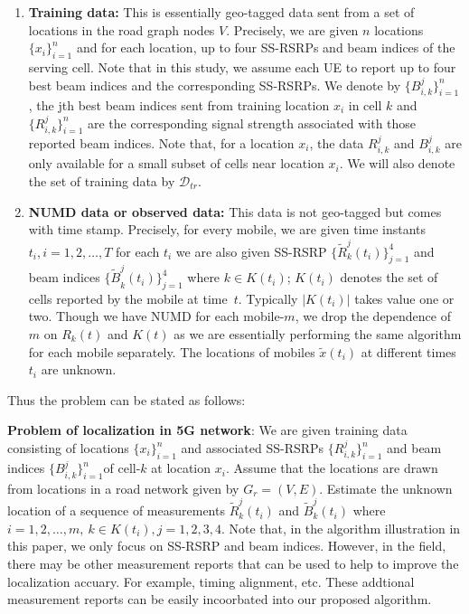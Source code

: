 \documentclass[conference, 10pt]{IEEEtran}
\newcommand{\abs}[1]{\lvert #1 \rvert}
\newcommand{\card}[1]{\abs{#1}}
\begin{document}
\begin{enumerate}

\item \textbf{Training data:} This is essentially geo-tagged data sent from
a set of locations in the road graph nodes $V$. Precisely, we are given $n$ locations
$\{x_i\}_{i=1}^n$ and for each location, up to four SS-RSRPs and beam indices of
the serving cell. Note that in this study, we assume each UE to report up to four best beam indices and the corresponding SS-RSRPs.
We denote by $\{B^{j}_{i,k}\}_{i=1}^n$, the jth best beam indices sent from training location $x_i$ in cell $k$ and $\{R^j_{i,k}\}_{i=1}^n$ are the corresponding signal strength 
associated with those reported beam indices. Note
that, for a location $x_i$, the data $R^j_{i,k}$  and $B^j_{i,k}$ are only available
for a small subset of cells near location $x_i$. We will also denote the set of
training data by $\mathcal{D}_{tr}$.

\item \textbf{NUMD data or observed data:} This data is not geo-tagged but comes
with time stamp. Precisely, for every mobile, we are given time instants
$t_i, i=1,2,\hdots,T$ for each $t_i$ we are also given SS-RSRP
$\{{\tilde{R}}^j_k(t_i)\}_{j=1}^4$ and beam indices ${\{\tilde{B}}^j_k(t_i)\}_{j=1}^4$ where $k\in K(t_i)$; $K(t_i)$ denotes the set of cells reported by
the mobile at time~$t$. Typically $\card{K(t_i)}$ takes value one or two.
Though we have NUMD for each mobile-$m$, we drop the dependence of $m$
on $R_k(t)$ and $K(t)$ as we are essentially performing the same algorithm
for each mobile separately. The locations of mobiles $\tilde{x}(t_i)$ at different
times $t_i$ are unknown.
	
\end{enumerate} 

Thus the problem can be stated as follows:

 {\bf Problem of localization in 5G network}: We are given training data consisting
of locations $\{x_i\}_{i=1}^n$ and associated SS-RSRPs  $\{R^j_{i,k}\}_{i=1}^n$ and beam indices $\{B^j_{i,k}\}_{i=1}^n$of
cell-$k$ at location $x_i$. Assume that the locations
are drawn from locations in a road network given by $G_r=(V,E)$. Estimate the unknown location of a sequence of measurements
${\tilde{R}}^j_k(t_i)$ and ${\tilde{B}}^j_k(t_i)$ where $i=1,2,\hdots,m,\ k\in K(t_i), j=1, 2, 3, 4$. 
Note that, in the algorithm illustration in this paper, we only focus on SS-RSRP and beam indices. However, in the field, there may be other measurement reports that 
can be used to help to improve the localization accuary. For example, timing alignment, etc. These addtional measurement reports can be easily incoorbated into our proposed algorithm.
\end{document}
